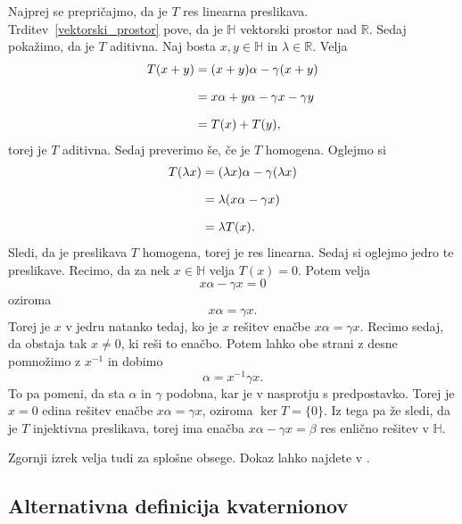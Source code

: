 \documentclass[mat1, tisk]{fmfdelo}
\numberwithin{equation}{section}
\begin{document}
\begin{dokaz}
    \medskip
    Najprej se prepričajmo, da je $T$ res linearna preslikava. Trditev~\ref{vektorski_prostor} pove, da je $\mathbb{H}$ 
    vektorski prostor nad $\mathbb{R}$. Sedaj pokažimo, da je $T$ aditivna. Naj bosta $x, y \in \mathbb{H}$ in 
    $\lambda \in \mathbb{R}$.  Velja
    \begin{equation*}
        \setlength{\jot}{10pt}
            \begin{aligned}
                T(x + y) &= (x + y)\alpha - \gamma (x + y) \\
                &= x\alpha + y\alpha - \gamma x - \gamma y \\
                &= T(x) + T(y),
            \end{aligned}
    \end{equation*}
    torej je $T$ aditivna. Sedaj preverimo še, če je $T$ homogena. Oglejmo si
    \begin{equation*}
        \setlength{\jot}{10pt}
            \begin{aligned}
                T(\lambda x) &= (\lambda x)\alpha - \gamma (\lambda x) \\
                &= \lambda (x\alpha - \gamma x) \\
                &= \lambda T(x).
            \end{aligned}
    \end{equation*}
    Sledi, da je preslikava $T$ homogena, torej je res linearna. Sedaj si oglejmo jedro te preslikave. Recimo, da za nek
    $x \in \mathbb{H}$ velja $T(x) = 0$. Potem velja 
    $$x\alpha - \gamma x = 0$$
    oziroma
    $$x\alpha = \gamma x.$$
    Torej je $x$ v jedru natanko tedaj, ko je $x$ rešitev enačbe $x\alpha = \gamma x$. Recimo sedaj, da obstaja tak
    $x \neq 0$, ki reši to enačbo. Potem lahko obe strani z desne pomnožimo z $x^{-1}$ in dobimo
    $$\alpha = x^{-1}\gamma x.$$
    To pa pomeni, da sta $\alpha$ in $\gamma$ podobna, kar je v nasprotju s predpostavko. Torej je $x = 0$ edina rešitev enačbe
    $x\alpha = \gamma x$, oziroma $\ker T = \{0\}$. Iz tega pa že sledi, da je $T$ injektivna preslikava, torej ima enačba
    $x\alpha - \gamma x = \beta$
    res enlično rešitev v $\mathbb{H}$.
\end{dokaz}

\begin{opomba}
    Zgornji izrek velja tudi za splošne obsege. Dokaz lahko najdete v \textcite{johnson}.
\end{opomba}

\subsection{Alternativna definicija kvaternionov}
\end{document}
